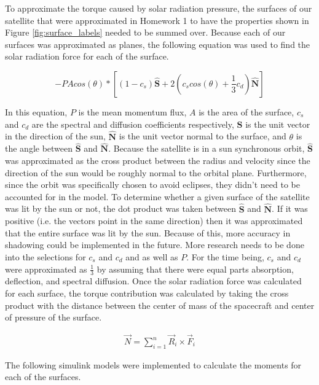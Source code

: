 To approximate the torque caused by solar radiation pressure, the surfaces of our satellite that were approximated in Homework 1 to have the properties shown in Figure \ref{fig:surface_labels} needed to be summed over. Because each of our surfaces was approximated as planes, the following equation was used to find the solar radiation force for each of the surface.

\begin{equation}
    - P A cos(\theta) * \left [ (1-c_s)\hat{\boldsymbol{S}} + 2 \left( c_s cos(\theta) + \frac{1}{3} c_d \right) \hat{\boldsymbol{N}} \right]
\end{equation}

In this equation, $P$ is the mean momentum flux, $A$ is the area of the surface, $c_s$ and $c_d$ are the spectral and diffusion coefficients respectively, $\hat{\boldsymbol{S}}$ is the unit vector in the direction of the sun, $\hat{\boldsymbol{N}}$ is the unit vector normal to the surface, and $\theta$ is the angle between $\hat{\boldsymbol{S}}$ and $\hat{\boldsymbol{N}}$. Because the satellite is in a sun synchronous orbit, $\hat{\boldsymbol{S}}$ was approximated as the cross product between the radius and velocity since the direction of the sun would be roughly normal to the orbital plane. Furthermore, since the orbit was specifically chosen to avoid eclipses, they didn't need to be accounted for in the model. To determine whether a given surface of the satellite was lit by the sun or not, the dot product was taken between $\hat{\boldsymbol{S}}$ and $\hat{\boldsymbol{N}}$. If it was positive (i.e. the vectors point in the same direction) then it was approximated that the entire surface was lit by the sun. Because of this, more accuracy in shadowing could be implemented in the future. More research needs to be done into the selections for $c_s$ and $c_d$ and as well as $P$. For the time being, $c_s$ and $c_d$ were approximated as $\frac{1}{3}$ by assuming that there were equal parts absorption, deflection, and spectral diffusion. Once the solar radiation force was calculated for each surface, the torque contribution was calculated by taking the cross product with the distance between the center of mass of the spacecraft and center of pressure of the surface. 

\begin{eqnarray}
    \vec N = \sum^n_{i=1} \vec R_i \times \vec F_i
\end{eqnarray}

The following simulink models were implemented to calculate the moments for each of the surfaces.

